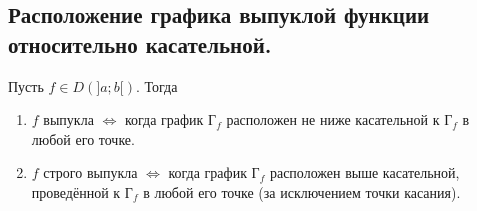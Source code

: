 \subsection{Расположение графика выпуклой функции относительно касательной.}
\begin{theorem}
	Пусть $f \in D(]a;b[)$. Тогда\begin{enumerate}
		\item $f$ выпукла $\Longleftrightarrow$ когда график Г$_{f}$ расположен не ниже касательной к Г$_{f}$ в любой его точке. 
		\item $f$ строго выпукла $\Longleftrightarrow$ когда график Г$_{f}$ расположен выше касательной, проведённой к Г$_{f}$ в любой его точке (за исключением точки касания).
	\end{enumerate}
\end{theorem}
